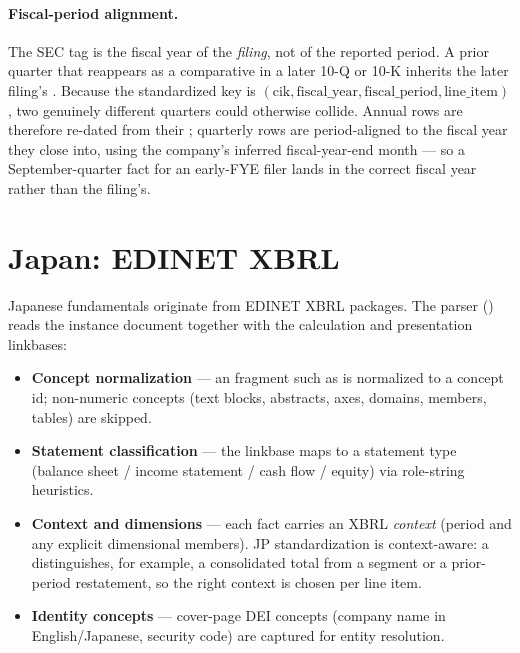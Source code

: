 \documentclass[11pt]{article}
\begin{document}
\paragraph{Fiscal-period alignment.} The SEC  tag is the fiscal year of
the \emph{filing}, not of the reported period. A prior quarter that reappears as a
comparative in a later 10-Q or 10-K inherits the later filing's . Because
the standardized key is $(\text{cik},\text{fiscal\_year},\text{fiscal\_period},
\text{line\_item})$, two genuinely different quarters could otherwise collide.
Annual rows are therefore re-dated from their ; quarterly rows are
period-aligned to the fiscal year they close into, using the company's inferred
fiscal-year-end month --- so a September-quarter fact for an early-FYE filer lands
in the correct fiscal year rather than the filing's.

\section{Japan: EDINET XBRL}
\label{sec:jp-raw}
Japanese fundamentals originate from EDINET XBRL packages. The parser
() reads the instance document together with the
calculation and presentation linkbases:

\begin{itemize}
  \item \textbf{Concept normalization} --- an  fragment such as
         is normalized to a
         concept id; non-numeric concepts (text blocks,
        abstracts, axes, domains, members, tables) are skipped.
  \item \textbf{Statement classification} --- the linkbase  maps to a
        statement type (balance sheet / income statement / cash flow / equity) via
        role-string heuristics.
  \item \textbf{Context and dimensions} --- each fact carries an XBRL \emph{context}
        (period and any explicit dimensional members). JP standardization is
        context-aware: a  distinguishes, for example, a
        consolidated total from a segment or a prior-period restatement, so the
        right context is chosen per line item.
  \item \textbf{Identity concepts} --- cover-page DEI concepts (company name in
        English/Japanese, security code) are captured for entity resolution.
\end{itemize}
\end{document}
